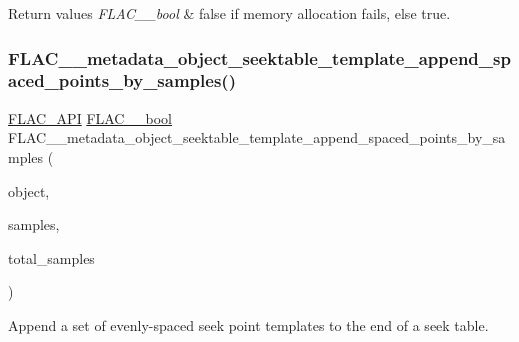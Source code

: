 \begin{DoxyRetVals}{Return values}
{\em F\+L\+A\+C\+\_\+\+\_\+bool} & {\ttfamily false} if memory allocation fails, else {\ttfamily true}. \\
\hline
\end{DoxyRetVals}
\mbox{\label{group__flac__metadata__object_gabf797b64b96808cabf1d995573680fe9}} 
\subsubsection{\texorpdfstring{F\+L\+A\+C\+\_\+\+\_\+metadata\+\_\+object\+\_\+seektable\+\_\+template\+\_\+append\+\_\+spaced\+\_\+points\+\_\+by\+\_\+samples()}{FLAC\_\_metadata\_object\_seektable\_template\_append\_spaced\_points\_by\_samples()}}
{\footnotesize\ttfamily \hyperlink{group__flac__export_ga56ca07df8a23310707732b1c0007d6f5}{F\+L\+A\+C\+\_\+\+A\+PI} \hyperlink{ordinals_8h_a95103469f1cbd78b8cf250194985b34e}{F\+L\+A\+C\+\_\+\+\_\+bool} F\+L\+A\+C\+\_\+\+\_\+metadata\+\_\+object\+\_\+seektable\+\_\+template\+\_\+append\+\_\+spaced\+\_\+points\+\_\+by\+\_\+samples (\begin{DoxyParamCaption}\item[{\hyperlink{struct_f_l_a_c_____stream_metadata}{F\+L\+A\+C\+\_\+\+\_\+\+Stream\+Metadata} $\ast$}]{object,  }\item[{unsigned}]{samples,  }\item[{\hyperlink{ordinals_8h_aa78c8c70a3eb8a58af7436f278acde8e}{F\+L\+A\+C\+\_\+\+\_\+uint64}}]{total\+\_\+samples }\end{DoxyParamCaption})}

Append a set of evenly-\/spaced seek point templates to the end of a seek table.


